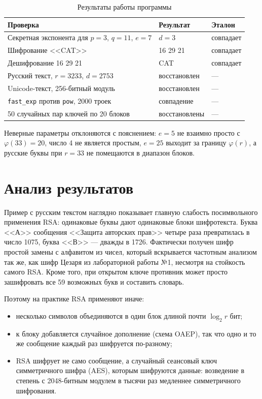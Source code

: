 \documentclass[14pt,a4paper]{extarticle}
\begin{document}
\begin{table}[H]
\caption{Результаты работы программы}
\label{tab:results}
\centering
\begin{tabularx}{\textwidth}{Xll}
\toprule
Проверка & Результат & Эталон \\
\midrule
Секретная экспонента для $p = 3$, $q = 11$, $e = 7$ & $d = 3$ & совпадает \\
Шифрование <<CAT>> & 16 29 21 & совпадает \\
Дешифрование 16 29 21 & CAT & совпадает \\
Русский текст, $r = 3233$, $d = 2753$ & восстановлен & --- \\
Unicode-текст, 256-битный модуль & восстановлен & --- \\
\texttt{fast\_exp} против \texttt{pow}, 2000 троек & совпадение & --- \\
50 случайных пар ключей по 20 блоков & восстановлены & --- \\
\bottomrule
\end{tabularx}
\end{table}

Неверные параметры отклоняются с пояснением: $e = 5$ не взаимно просто с
$\varphi(33) = 20$, число 4 не является простым, $e = 25$ выходит за границу
$\varphi(r)$, а русские буквы при $r = 33$ не помещаются в диапазон блоков.


\section{Анализ результатов}

Пример с русским текстом наглядно показывает главную слабость посимвольного
применения RSA: одинаковые буквы дают одинаковые блоки шифротекста. Буква <<А>>
сообщения <<Защита авторских прав>> четыре раза превратилась в число 1075, буква
<<В>> --- дважды в 1726. Фактически получен шифр простой замены с алфавитом из
чисел, который вскрывается частотным анализом так же, как шифр Цезаря из лабораторной
работы №1, несмотря на стойкость самого RSA. Кроме того, при открытом ключе
противник может просто зашифровать все 59 возможных букв и составить словарь.

Поэтому на практике RSA применяют иначе:
\begin{itemize}
\item несколько символов объединяются в один блок длиной почти $\log_2 r$ бит;
\item к блоку добавляется случайное дополнение (схема OAEP), так что одно и то же
сообщение каждый раз шифруется по-разному;
\item RSA шифрует не само сообщение, а случайный сеансовый ключ симметричного шифра
(AES), которым шифруются данные: возведение в степень с 2048-битным модулем в тысячи
раз медленнее симметричного шифрования.
\end{itemize}
\end{document}

